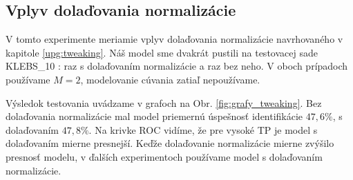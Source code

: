 \subsection{Vplyv dolaďovania normalizácie}
\label{exp:tweaking}
V tomto experimente meriamie vplyv dolaďovania normalizácie navrhovaného v kapitole \ref{upg:tweaking}. Náš model sme
dvakrát pustili na testovacej sade KLEBS\_10 : 
raz s dolaďovaním
normalizácie a raz bez neho. V oboch prípadoch používame $M=2$, modelovanie cúvania zatiaľ nepoužívame.

Výsledok testovania uvádzame v grafoch na Obr. \ref{fig:grafy_tweaking}. Bez dolaďovania normalizácie mal model priemernú
úspešnosť identifikácie $47,6 \%$, s dolaďovaním $47,8 \%$. Na krivke ROC vidíme, že pre vysoké TP je model s dolaďovaním
mierne presnejší. Keďže dolaďovanie normalizácie mierne zvýšilo presnosť modelu, v ďalších experimentoch
používame model s dolaďovaním normalizácie.

